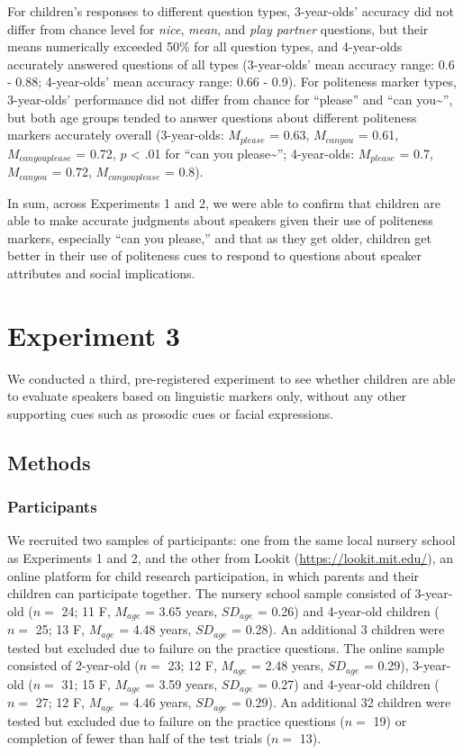 \documentclass[10pt, letterpaper]{article}
\begin{document}
For children's responses to different question types, 3-year-olds'
accuracy did not differ from chance level for \emph{nice}, \emph{mean},
and \emph{play partner} questions, but their means numerically exceeded
50\% for all question types, and 4-year-olds accurately answered
questions of all types (3-year-olds' mean accuracy range: 0.6 - 0.88;
4-year-olds' mean accuracy range: 0.66 - 0.9). For politeness marker
types, 3-year-olds' performance did not differ from chance for
``please'' and ``can you\textasciitilde{}'', but both age groups tended
to answer questions about different politeness markers accurately
overall (3-year-olds: \(M_{please}\) = 0.63, \(M_{can you}\) = 0.61,
\(M_{can you please}\) = 0.72, \(p\) \textless{} .01 for ``can you
please\textasciitilde{}''; 4-year-olds: \(M_{please}\) = 0.7,
\(M_{can you}\) = 0.72, \(M_{can you please}\) = 0.8).

In sum, across Experiments 1 and 2, we were able to confirm that
children are able to make accurate judgments about speakers given their
use of politeness markers, especially ``can you please,'' and that as
they get older, children get better in their use of politeness cues to
respond to questions about speaker attributes and social implications.

\section{Experiment 3}\label{experiment-3}

We conducted a third, pre-registered experiment to see whether children
are able to evaluate speakers based on linguistic markers only, without
any other supporting cues such as prosodic cues or facial expressions.

\subsection{Methods}\label{methods-2}

\subsubsection{Participants}\label{participants-2}

We recruited two samples of participants: one from the same local
nursery school as Experiments 1 and 2, and the other from Lookit
(\url{https://lookit.mit.edu/}), an online platform for child research
participation, in which parents and their children can participate
together. The nursery school sample consisted of 3-year-old (\(n=\) 24;
11 F, \(M_{age}\) = 3.65 years, \(SD_{age}\) = 0.26) and 4-year-old
children (\(n=\) 25; 13 F, \(M_{age}\) = 4.48 years, \(SD_{age}\) =
0.28). An additional 3 children were tested but excluded due to failure
on the practice questions. The online sample consisted of 2-year-old
(\(n=\) 23; 12 F, \(M_{age}\) = 2.48 years, \(SD_{age}\) = 0.29),
3-year-old (\(n=\) 31; 15 F, \(M_{age}\) = 3.59 years, \(SD_{age}\) =
0.27) and 4-year-old children (\(n=\) 27; 12 F, \(M_{age}\) = 4.46
years, \(SD_{age}\) = 0.29). An additional 32 children were tested but
excluded due to failure on the practice questions (\(n=\) 19) or
completion of fewer than half of the test trials (\(n=\) 13).
\end{document}
